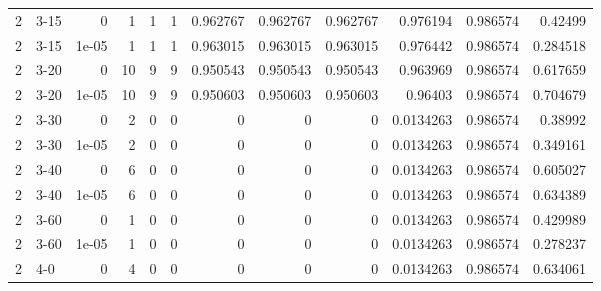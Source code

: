 \begin{tabular}{rlrrrrrrrrrr}
     2 & 3-15   &      0     &           1 &                 1 &                 1 &     0.962767    &     0.962767    &      0.962767    &        0.976194  &               0.986574 &           0.42499  \\
     2 & 3-15   &      1e-05 &           1 &                 1 &                 1 &     0.963015    &     0.963015    &      0.963015    &        0.976442  &               0.986574 &           0.284518 \\
     2 & 3-20   &      0     &          10 &                 9 &                 9 &     0.950543    &     0.950543    &      0.950543    &        0.963969  &               0.986574 &           0.617659 \\
     2 & 3-20   &      1e-05 &          10 &                 9 &                 9 &     0.950603    &     0.950603    &      0.950603    &        0.96403   &               0.986574 &           0.704679 \\
     2 & 3-30   &      0     &           2 &                 0 &                 0 &     0           &     0           &      0           &        0.0134263 &               0.986574 &           0.38992  \\
     2 & 3-30   &      1e-05 &           2 &                 0 &                 0 &     0           &     0           &      0           &        0.0134263 &               0.986574 &           0.349161 \\
     2 & 3-40   &      0     &           6 &                 0 &                 0 &     0           &     0           &      0           &        0.0134263 &               0.986574 &           0.605027 \\
     2 & 3-40   &      1e-05 &           6 &                 0 &                 0 &     0           &     0           &      0           &        0.0134263 &               0.986574 &           0.634389 \\
     2 & 3-60   &      0     &           1 &                 0 &                 0 &     0           &     0           &      0           &        0.0134263 &               0.986574 &           0.429989 \\
     2 & 3-60   &      1e-05 &           1 &                 0 &                 0 &     0           &     0           &      0           &        0.0134263 &               0.986574 &           0.278237 \\
     2 & 4-0    &      0     &           4 &                 0 &                 0 &     0           &     0           &      0           &        0.0134263 &               0.986574 &           0.634061 \\

\end{tabular}
